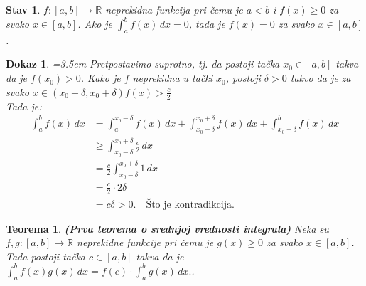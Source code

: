 \documentclass[11pt]{article}
\newcounter{mathitem}
\theoremstyle{plain}
\newtheorem{teorema}[mathitem]{Teorema}
\newtheorem{stav}[mathitem]{Stav}
\theoremstyle{serbnodot}
\newtheorem*{dokaz}{Dokaz}
\begin{document}
\begin{stav}
      \( f:[a,b] \to \mathbb{R} \) neprekidna funkcija pri čemu je \( a < b \) i \( f(x) \geq 0 \) za svako \( x \in [a,b] \). Ako je \( \int_{a}^{b} f(x) \, dx = 0 \), tada je \( f(x) = 0 \) za svako \( x \in [a,b] \).
\end{stav}

\begin{dokaz} \quad
    \par\hangindent=3.5em
    Pretpostavimo suprotno, tj. da postoji tačka \( x_0 \in [a,b] \) takva da je \( f(x_0) > 0 \). Kako je \( f \) neprekidna u tački \( x_0 \), postoji \( \delta > 0 \) takvo da je za svako \( x \in (x_0 - \delta, x_0 + \delta) f(x) > \frac{c}{2} \) \\
    Tada je:
    \[
      \begin{aligned}
      \int_{a}^{b} f(x)\,dx
      &= \int_{a}^{x_0-\delta} f(x)\,dx
      + \int_{x_0-\delta}^{x_0+\delta} f(x)\,dx
      + \int_{x_0+\delta}^{b} f(x)\,dx \\[4pt]
      &\ge \int_{x_0-\delta}^{x_0+\delta} \frac{c}{2}\,dx \\[4pt]
      &= \frac{c}{2} \int_{x_0-\delta}^{x_0+\delta} 1\,dx \\[4pt]
      &= \frac{c}{2}\cdot 2\delta \\[4pt]
      &= c\delta > 0. \quad \text{Što je kontradikcija.}
      \end{aligned}
    \]

\end{dokaz}
\newpage
\begin{teorema}
  \textbf{(Prva teorema o srednjoj vrednosti integrala)} Neka su \( f,g:[a,b] \to \mathbb{R} \) neprekidne funkcije pri čemu je \( g(x) \geq 0 \) za svako \( x \in [a,b] \). 
  Tada postoji tačka \( c \in [a,b] \) takva da je \( \int_{a}^{b} f(x) g(x) \, dx = f(c) \cdot \int_{a}^{b} g(x) \, dx. \).
\end{teorema}
\end{document}
